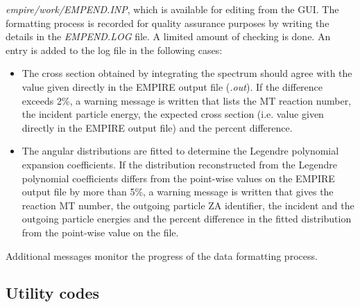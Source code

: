 \documentclass[twocolumn,amsmath,amssymb,10pt,groupedaddress,a4paper]{revtex4}
\begin{document}
\emph{empire/work/EMPEND.INP}, which is available for editing from
the GUI.
The formatting process is recorded for quality assurance purposes
by writing the details in the \emph{EMPEND.LOG} file. A limited amount
of checking is done. An entry is added to the log file in the following
cases:
\begin{itemize}
\item The cross section obtained by integrating the spectrum should agree
with the value given directly in the EMPIRE output file (\emph{.out}).
If the difference exceeds 2\%, a warning message is written that lists
the MT reaction number, the incident particle energy, the expected
cross section (i.e. value given directly in the EMPIRE output file)
and the percent difference.
\item The angular distributions are fitted to determine the Legendre polynomial
expansion coefficients. If the distribution reconstructed from the
Legendre polynomial coefficients differs from the point-wise values
on the EMPIRE output file by more than 5\%, a warning message is written
that gives the reaction MT number, the outgoing particle ZA identifier,
the incident and the outgoing particle energies and the percent difference
in the fitted distribution from the point-wise value on the file.
\end{itemize}
Additional messages monitor the progress of the data formatting process.

\subsection{Utility codes}
\end{document}
